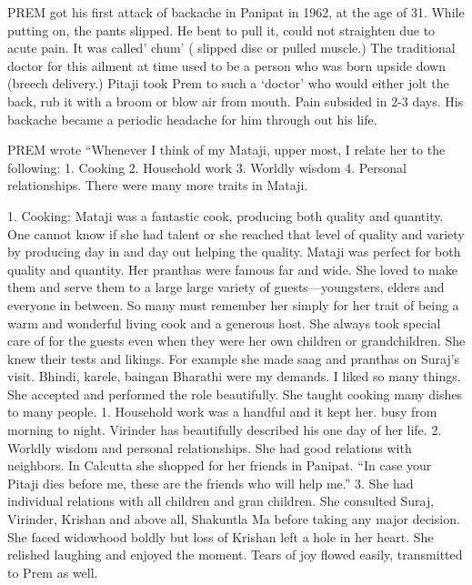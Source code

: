 PREM got his first attack of backache in Panipat in 1962, at the age of 31. While putting on, the pants slipped. He bent to pull it, could not straighten due to acute pain. It was called’ chum’ ( slipped disc or pulled muscle.) The traditional doctor for this ailment at time used to be a person who was born upside down (breech delivery.) Pitaji took Prem to such a ‘doctor’ who would either jolt the back, rub it with a broom or blow air from mouth. Pain subsided in 2-3 days. His backache became a periodic headache for him through out his life. 

PREM wrote “Whenever I think of my Mataji, upper most, I relate her to the following:
1.	Cooking
2.	Household work
3.	Worldly wisdom 
4.	Personal relationships.
There were many more traits in Mataji. 

1.	Cooking: Mataji was a fantastic cook, producing both quality and quantity. One cannot know if she had talent or she reached that level of quality and variety by producing day in and day out helping the quality. Mataji was perfect for both quality and quantity. Her pranthas were famous far and wide. She loved to make them and serve them to a large large variety of guests—youngsters, elders and everyone in between. So many must remember her simply for her trait of being a warm and wonderful living cook and a generous host. 
She always took special care of for the guests even when they were her own children or grandchildren. She knew their tests and likings. For example she made saag and pranthas on Suraj’s visit. Bhindi, karele, baingan Bharathi were my demands. I liked so many things. 
She accepted and performed the role beautifully. She taught cooking many dishes to many people. 
1.	Household work was a handful and it kept her. busy from morning to night. Virinder has beautifully described his one day of her life. 
2.	Worldly wisdom and personal relationships. She had good relations with neighbors. In Calcutta she shopped for her friends in Panipat. “In case your Pitaji dies before me, these are the friends who will help me.” 
3.	She had individual relations with all children and gran children. She consulted Suraj, Virinder, Krishan and above all, Shakuntla Ma before taking any major decision. She faced widowhood boldly but loss of Krishan left a hole in her heart. She relished laughing and enjoyed the moment. Tears of joy flowed easily, transmitted to Prem as well. 

